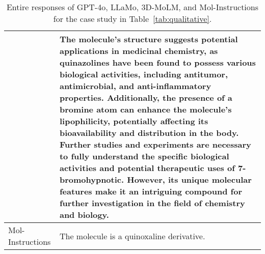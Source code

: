 \begin{table*}[ht!]
\begin{tabular}{p{2.15cm} p{14.15cm}}
& The molecule's structure suggests potential applications in medicinal chemistry, as quinazolines have been found to possess various biological activities, including \textcolor{tabred}{antitumor, antimicrobial, and anti-inflammatory properties}. Additionally, the presence of a bromine atom can enhance the molecule's lipophilicity, potentially affecting its bioavailability and distribution in the body. Further studies and experiments are necessary to fully understand the specific biological activities and potential therapeutic uses of 7-bromohypnotic. However, its unique molecular features make it an intriguing compound for further investigation in the field of chemistry and biology.\\
\midrule
Mol-Instructions & The molecule is a \textcolor{tabred}{quinoxaline derivative}. \\
\bottomrule
\end{tabular}
\vspace{-0.1in}
\caption{Entire responses of GPT-4o, LLaMo, 3D-MoLM, and Mol-Instructions for the case study in Table~\ref{tab:qualitative}.}
\vspace{-0.05in}
\label{tab:qualitative_full_part2}
\end{table*}